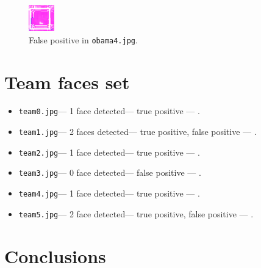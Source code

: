 \documentclass[12pt,a4paper,twocolumn]{article}
\begin{document}
\begin{figure}[]
\centering
\includegraphics[width=0.1\textwidth]{false-positive.png}
\caption{False positive in \texttt{obama4.jpg}.\label{fig:false-positive}}
\end{figure}

\section*{Team faces set}
\begin{itemize}
\item \texttt{team0.jpg}--- 1 face detected--- true positive --- .
\item \texttt{team1.jpg}--- 2 faces detected--- true positive, false positive --- .
\item \texttt{team2.jpg}--- 1 face detected--- true positive --- .
\item \texttt{team3.jpg}--- 0 face detected--- false positive --- .
\item \texttt{team4.jpg}--- 1 face detected--- true positive --- .
\item \texttt{team5.jpg}--- 2 face detected--- true positive, false positive --- .
\end{itemize}

\section*{Conclusions}
\lipsum[1]
\end{document}
